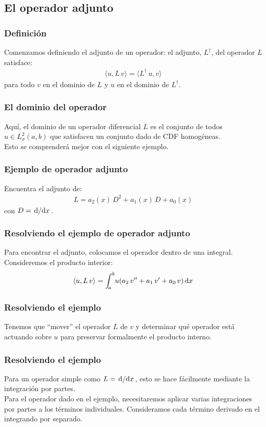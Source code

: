 \documentclass[12pt]{beamer}
\begin{document}
\subsection{El operador adjunto}

\begin{frame}
\frametitle{Definición}
Comenzamos definiendo el adjunto de un operador: \pause el adjunto, $L^{\dagger}$, del operador $L$ satisface:
\begin{align*}
\langle u, L \, v \rangle = \langle L^{\dagger} \, u,  v \rangle
\end{align*}
para todo $v$ en el dominio de $L$ y $u$ en el dominio de $L^{\dagger}$.
\end{frame}
\begin{frame}
\frametitle{El dominio del operador}
Aquí, el dominio de un operador diferencial $L$ es el conjunto de todos $u \in L_{\sigma}^{2} (a, b)$ que satisfacen un conjunto dado de CDF homogéneas.
\\
\bigskip
\pause
Esto se comprenderá mejor con el siguiente ejemplo.
\end{frame}
\begin{frame}
\frametitle{Ejemplo de operador adjunto}
Encuentra el adjunto de:
\begin{align*}
L = a_{2}(x) \, D^{2} + a_{1}(x) \, D + a_{0}(x)
\end{align*}
con $D = \dv*{x}$.
\end{frame}
\begin{frame}
\frametitle{Resolviendo el ejemplo de operador adjunto}    
Para encontrar el adjunto, colocamos el operador dentro de una integral. \pause Consideremos el producto interior:
\pause
\begin{align*}
\langle u , L \, v \rangle = \scaleint{5ex}_{\bs a}^{b} u (a_{2} \, \sderivada{v} + a_{1} \, \pderivada{v} + a_{0} \, v) \dd{x}
\end{align*}
\end{frame}
\begin{frame}
\frametitle{Resolviendo el ejemplo}
Tenemos que \enquote{mover} el operador $L$ de $v$ \pause y determinar qué operador está actuando sobre $u$ para preservar formalmente el producto interno.
\\
\bigskip
\pause
\end{frame}
\begin{frame}
\frametitle{Resolviendo el ejemplo}    
Para un operador simple como $L = \dv*{x}$, esto se hace fácilmente mediante la integración por partes.
\\
\bigskip
\pause
Para el operador dado en el ejemplo, necesitaremos aplicar varias integraciones por partes a los términos individuales. Consideramos cada término derivado en el integrando por separado.
\end{frame}
\end{document}
